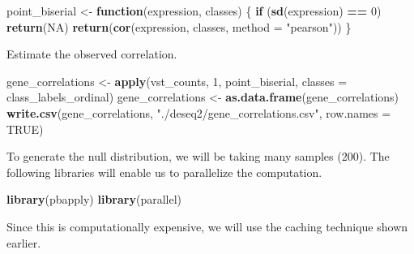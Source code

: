 \documentclass[
]{book}
\newenvironment{Shaded}{\begin{snugshade}}{\end{snugshade}}
\newcommand{\AttributeTok}[1]{\textcolor[rgb]{0.13,0.29,0.53}{#1}}
\newcommand{\ConstantTok}[1]{\textcolor[rgb]{0.56,0.35,0.01}{#1}}
\newcommand{\ControlFlowTok}[1]{\textcolor[rgb]{0.13,0.29,0.53}{\textbf{#1}}}
\newcommand{\DecValTok}[1]{\textcolor[rgb]{0.00,0.00,0.81}{#1}}
\newcommand{\FunctionTok}[1]{\textcolor[rgb]{0.13,0.29,0.53}{\textbf{#1}}}
\newcommand{\NormalTok}[1]{#1}
\newcommand{\OtherTok}[1]{\textcolor[rgb]{0.56,0.35,0.01}{#1}}
\newcommand{\SpecialCharTok}[1]{\textcolor[rgb]{0.81,0.36,0.00}{\textbf{#1}}}
\newcommand{\StringTok}[1]{\textcolor[rgb]{0.31,0.60,0.02}{#1}}
\begin{document}
\begin{Shaded}
\begin{Highlighting}[numbers=left,,]
\NormalTok{point\_biserial }\OtherTok{\textless{}{-}} \ControlFlowTok{function}\NormalTok{(expression, classes) \{}
  \ControlFlowTok{if}\NormalTok{ (}\FunctionTok{sd}\NormalTok{(expression) }\SpecialCharTok{==} \DecValTok{0}\NormalTok{) }\FunctionTok{return}\NormalTok{(}\ConstantTok{NA}\NormalTok{)}
  \FunctionTok{return}\NormalTok{(}\FunctionTok{cor}\NormalTok{(expression, classes, }\AttributeTok{method =} \StringTok{"pearson"}\NormalTok{))}
\NormalTok{\}}
\end{Highlighting}
\end{Shaded}

Estimate the observed correlation.

\begin{Shaded}
\begin{Highlighting}[numbers=left,,]
\NormalTok{gene\_correlations }\OtherTok{\textless{}{-}} \FunctionTok{apply}\NormalTok{(vst\_counts, }\DecValTok{1}\NormalTok{, point\_biserial, }\AttributeTok{classes =}\NormalTok{ class\_labels\_ordinal)}
\NormalTok{gene\_correlations }\OtherTok{\textless{}{-}} \FunctionTok{as.data.frame}\NormalTok{(gene\_correlations)}
\FunctionTok{write.csv}\NormalTok{(gene\_correlations, }\StringTok{"./deseq2/gene\_correlations.csv"}\NormalTok{, }\AttributeTok{row.names =} \ConstantTok{TRUE}\NormalTok{)}
\end{Highlighting}
\end{Shaded}

To generate the null distribution, we will be taking many samples (200). The following libraries will enable us to parallelize the computation.

\begin{Shaded}
\begin{Highlighting}[numbers=left,,]
\FunctionTok{library}\NormalTok{(pbapply)}
\FunctionTok{library}\NormalTok{(parallel)}
\end{Highlighting}
\end{Shaded}

Since this is computationally expensive, we will use the caching technique shown earlier.
\end{document}
